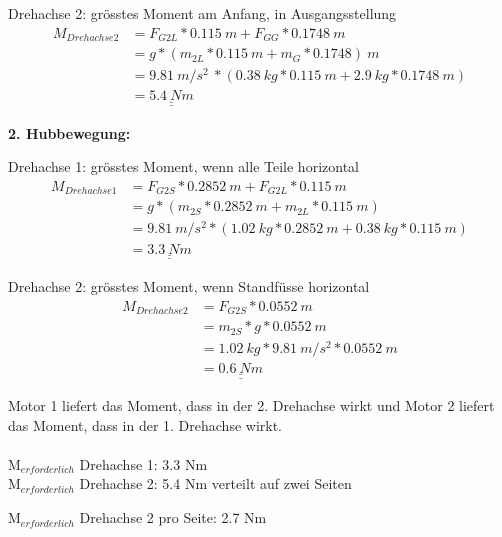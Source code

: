 Drehachse 2: grösstes Moment am Anfang, in Ausgangsstellung
\begin{align*}
    M_{Drehachse 2} &= F_{G2L} * 0.115\ m + F_{GG} * 0.1748\ m \\
    &= g * (m_{2L} * 0.115\ m + m_{G} * 0.1748)\ m \\
    &= 9.81\ m/s^2\ * (0.38\ kg * 0.115\ m + 2.9\ kg * 0.1748\ m) \\
    &= \underline{\underline{5.4\ Nm}}
\end{align*}

\textbf{2. Hubbewegung:}

Drehachse 1: grösstes Moment, wenn alle Teile horizontal
\begin{align*}
    M_{Drehachse 1} &= F_{G2S} * 0.2852\ m + F_{G2L} * 0.115\ m \\
    &= g * (m_{2S} * 0.2852\ m + m_{2L} * 0.115\ m) \\
    &= 9.81\ m/s^2 * (1.02\ kg * 0.2852\ m + 0.38\ kg * 0.115\ m) \\
    &= \underline{\underline{3.3\ Nm}}
\end{align*}

Drehachse 2: grösstes Moment, wenn Standfüsse horizontal
\begin{align*}
    M_{Drehachse 2} &= F_{G2S} * 0.0552\ m \\
    &= m_{2S} * g * 0.0552\ m \\
    &= 1.02\ kg * 9.81\ m/s^2 * 0.0552\ m \\
    &=\underline{\underline{0.6\ Nm}}
\end{align*}

Motor 1 liefert das Moment, dass in der 2. Drehachse wirkt und Motor 2 liefert das Moment, dass in der 1. Drehachse wirkt.\\
\\
M$_{erforderlich}$ Drehachse 1: 3.3 Nm\\

M$_{erforderlich}$ Drehachse 2: 5.4 Nm verteilt auf zwei Seiten

M$_{erforderlich}$ Drehachse 2 pro Seite: 2.7 Nm
